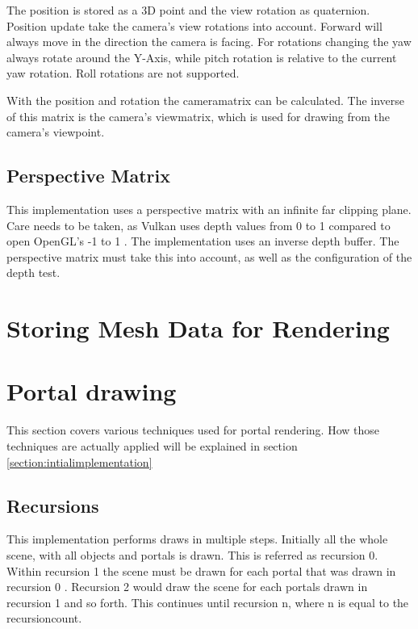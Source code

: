 The position is stored as a 3D point and the view rotation as quaternion. Position update take the camera's view rotations into account. Forward will always move in the direction the camera is facing. For rotations changing the yaw always rotate around the Y-Axis, while pitch rotation is relative to the current yaw rotation. Roll rotations are not supported.

With the position and rotation the \gls{cameramatrix} can be calculated. The inverse of this matrix is the camera's \gls{viewmatrix}, which is used for drawing from the camera's viewpoint.

\subsection{Perspective Matrix}
This implementation uses a perspective matrix with an infinite far clipping plane. Care needs to be taken, as Vulkan uses depth values from 0 to 1 \cite{khronos:vulkan:spec1.1} compared to open OpenGL's -1 to 1 \cite{khronos:openGL:spec4.6}. The implementation uses an inverse depth buffer. The perspective matrix must take this into account, as well as the configuration of the depth test.


\section{Storing Mesh Data for Rendering}


\section{Portal drawing}
\label{section:portaldrawing}

This section covers various techniques used for portal rendering. How those techniques are actually applied will be explained in section \ref{section:intialimplementation}

\subsection{Recursions}


This implementation performs draws in multiple steps. Initially all the whole scene, with all objects and portals is drawn. This is referred as recursion 0. Within recursion 1 the scene must be drawn for each portal that was drawn in recursion 0 . Recursion 2 would draw the scene for each portals drawn in recursion 1 and so forth. This continues until recursion n, where n is equal to the \gls{recursioncount}.


